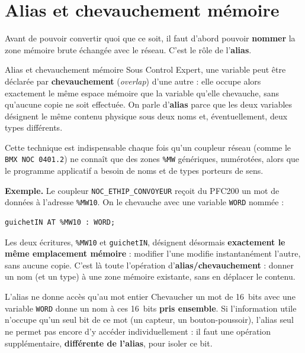 \section{Alias et chevauchement mémoire}
\label{secAliasChevauchement}

Avant de pouvoir convertir quoi que ce soit, il faut d'abord pouvoir
\textbf{nommer} la zone mémoire brute échangée avec le réseau. C'est le
rôle de l'\textbf{alias}.

\begin{UPSTIinfor}{Alias et chevauchement mémoire}
Sous Control Expert, une variable peut être déclarée par
\textbf{chevauchement} (\emph{overlap}) d'une autre : elle occupe alors
exactement le même espace mémoire que la variable qu'elle chevauche, sans
qu'aucune copie ne soit effectuée. On parle d'\textbf{alias} parce que les
deux variables désignent le même contenu physique sous deux noms et,
éventuellement, deux types différents.

Cette technique est indispensable chaque fois qu'un coupleur réseau
(comme le \texttt{BMX~NOC~0401.2}) ne connaît que des zones \texttt{\%MW}
génériques, numérotées, alors que le programme applicatif a besoin de
noms et de types porteurs de sens.
\end{UPSTIinfor}

\textbf{Exemple.} Le coupleur \texttt{NOC\_ETHIP\_CONVOYEUR} reçoit du
PFC200 un mot de données à l'adresse \texttt{\%MW10}. On le chevauche
avec une variable \texttt{WORD} nommée :

\begin{lstlisting}
guichetIN AT %MW10 : WORD;
\end{lstlisting}

Les deux écritures, \texttt{\%MW10} et \texttt{guichetIN}, désignent
désormais \textbf{exactement le même emplacement mémoire} : modifier
l'une modifie instantanément l'autre, sans aucune copie. C'est là toute
l'opération d'\textbf{alias/chevauchement} : donner un nom (et un type)
à une zone mémoire existante, sans en déplacer le contenu.

\begin{UPSTIwarning}{L'alias ne donne accès qu'au mot entier}
Chevaucher un mot de 16~bits avec une variable \texttt{WORD} donne un nom
à ces 16~bits \textbf{pris ensemble}. Si l'information utile n'occupe
qu'un seul bit de ce mot (un capteur, un bouton-poussoir), l'alias seul ne
permet pas encore d'y accéder individuellement : il faut une opération
supplémentaire, \textbf{différente de l'alias}, pour isoler ce bit.
\end{UPSTIwarning}

